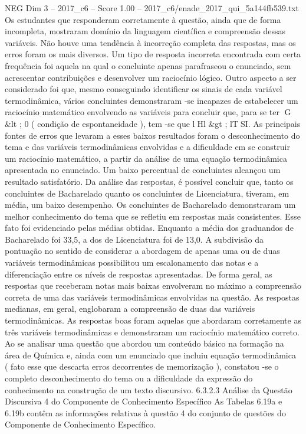 \begin{textsample}{NEG Dim 3 – 2017\_c6 – Score 1.00 – 2017\_c6/enade\_2017\_qui\_5a144fb539.txt}
Os estudantes que responderam corretamente à questão, ainda que de forma incompleta, mostraram domínio da linguagem científica e compreensão dessas variáveis.
Não houve uma tendência à incorreção completa das respostas, mas os erros foram os mais diversos.
Um tipo de resposta incorreta encontrada com certa frequência foi aquela na qual o concluinte apenas parafraseou o enunciado, sem acrescentar contribuições e desenvolver um raciocínio lógico.
Outro aspecto a ser considerado foi que, mesmo conseguindo identificar os sinais de cada variável termodinâmica, vários concluintes demonstraram -se incapazes de estabelecer um raciocínio matemático envolvendo as variáveis para concluir que, para se ter G \&lt ; 0 ( condição de espontaneidade ), tem -se que lHl \&gt ; lTSI.
As principais fontes de erros que levaram a esses baixos resultados foram o desconhecimento do tema e das variáveis termodinâmicas envolvidas e a dificuldade em se construir um raciocínio matemático, a partir da análise de uma equação termodinâmica apresentada no enunciado.
Um baixo percentual de concluintes alcançou um resultado satisfatório.
Da análise das respostas, é possível concluir que, tanto os concluintes de Bacharelado quanto os concluintes de Licenciatura, tiveram, em média, um baixo desempenho.
Os concluintes de Bacharelado demonstraram um melhor conhecimento do tema que se refletiu em respostas mais consistentes.
Esse fato foi evidenciado pelas médias obtidas.
Enquanto a média dos graduandos de Bacharelado foi 33,5, a dos de Licenciatura foi de 13,0.
A subdivisão da pontuação no sentido de considerar a abordagem de apenas uma ou de duas variáveis termodinâmicas possibilitou um escalonamento das notas e a diferenciação entre os níveis de respostas apresentadas.
De forma geral, as respostas que receberam notas mais baixas envolveram no máximo a compreensão correta de uma das variáveis termodinâmicas envolvidas na questão.
As respostas medianas, em geral, englobaram a compreensão de duas das variáveis termodinâmicas.
As respostas boas foram aquelas que abordaram corretamente as três variáveis termodinâmicas e demonstraram um raciocínio matemático correto.
Ao se analisar uma questão que abordou um conteúdo básico na formação na área de Química e, ainda com um enunciado que incluiu equação termodinâmica ( fato esse que descarta erros decorrentes de memorização ), constatou -se o completo desconhecimento do tema ou a dificuldade da expressão do conhecimento na construção de um texto discursivo. 6.3.2.3 Análise da Questão Discursiva 4 do Componente de Conhecimento Específico As Tabelas 6.19a e 6.19b contêm as informações relativas à questão 4 do conjunto de questões do Componente de Conhecimento Específico.

\end{textsample}
